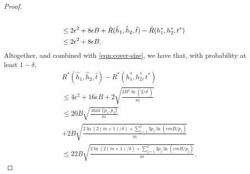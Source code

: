 \documentclass{article}
\begin{document}
\begin{proof}
\begin{align}
\\ & \leq 2 \epsilon^{2} + 8 \epsilon B + \hat{R}(\hat{h}_{1}, \hat{h}_{2}, \hat{t}) - \hat{R}(h_{1}^{*},h_{2}^{*},t^{*}) \notag
\\ & \leq  2 \epsilon^{2} + 8 \epsilon B. \label{eqn:empirical-diff-nonpositive}
\end{align}
Altogether, and combined with \eqref{eqn:cover-size}, we have that, with probability at least $1-\delta$, 
\begin{align*}
&R^{*}(\hat{h}_{1},\hat{h}_{2},\hat{t}) - R^{*}(h_{1}^{*},h_{2}^{*},t^{*})\\
& \leq 4 \epsilon^{2} + 16 \epsilon B + 2 \sqrt{\frac{2 B^{2} \ln(2/\delta^{\prime})}{m}}
\\ & \leq 20 B \sqrt{\frac{\max\{p_{1},p_{2}\}}{m}} 
\\ & + 2 B \sqrt{\frac{2 \ln(2(m+1)/\delta) + \sum_{j=1}^{2} 3 p_{j} \ln( e m B / p_{j} )}{m}}
\\ & \leq 22 B \sqrt{\frac{2 \ln(2(m+1)/\delta) + \sum_{j=1}^{2} 3 p_{j} \ln( e m B / p_{j} )}{m}}.
\end{align*}
\end{proof}
\end{document}
